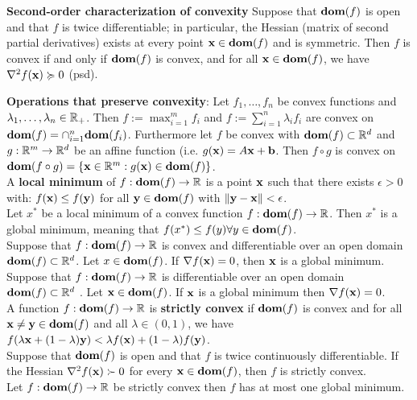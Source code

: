 \begin{framed}
    \textbf{Second-order characterization of convexity} Suppose that $\textbf{dom}(f)$ is open and that $f$ is twice differentiable; in particular, the Hessian (matrix of second partial derivatives) exists at every point $\mathbf{x} \in \textbf{dom}(f)$ and is symmetric. Then $f$ is convex if and only if $\textbf{dom}(f)$ is convex, and for all $\mathbf{x} \in \textbf{dom}(f)$, we have $\nabla^2 f(\mathbf{x}) \succcurlyeq 0$ (psd).
\end{framed}
\textbf{Operations that preserve convexity}: Let $f_1, \dots, f_n$ be convex functions and $\lambda_1, \dots, \lambda_n \in \mathbb{R}_{+}$. Then $f := \max_{i=1}^m{f_i}$ and $f := \sum_{i=1}^n{\lambda_i f_i}$ are convex on $\textbf{dom}(f) = \cap_{i=1}^n{\textbf{dom}(f_i)}$. Furthermore let $f$ be convex with $\textbf{dom}(f) \subset \mathbb{R}^d$ and $g : \mathbb{R}^m \rightarrow \mathbb{R}^d$ be an affine function (i.e. $g(\mathbf{x}) = A \mathbf{x} + \mathbf{b}$. Then $f \circ g$ is convex on $\textbf{dom}(f \circ g) = \{ \mathbf{x} \in \mathbb{R}^m : g(\mathbf{x}) \in  \textbf{dom}(f)\}$.\\
A \textbf{local minimum} of $f: \textbf{dom}(f) \rightarrow \mathbb{R}$ is a point $\mathbf{x}$ such that there exists $\epsilon > 0$ with: $f(\mathbf{x}) \leq f(\mathbf{y})$ for all $\mathbf{y} \in \textbf{dom}(f)$ with $\norm{\mathbf{y} - \mathbf{x}} < \epsilon$. \\
Let $x^*$ be a local minimum of a convex function $f : \textbf{dom}(f) \rightarrow \mathbb{R}$. Then $x^*$ is a global minimum, meaning that $f (x^*) \leq f(y) \forall y \in \textbf{dom}(f)$. \\
Suppose that $f : \textbf{dom}(f) \rightarrow \mathbb{R}$ is convex and differentiable over an open domain $\textbf{dom}(f) \subset \mathbb{R}^d$. Let $x \in \textbf{dom}(f)$. If $\nabla f(\mathbf{x}) = 0$, then $\mathbf{x}$ is a global minimum. \\
Suppose that $f : \textbf{dom}(f) \rightarrow \mathbb{R}$ is differentiable over an open domain $\textbf{dom}(f) \subset \mathbb{R}^d$ . Let $\mathbf{x} \in \textbf{dom}(f)$. If $\mathbf{x}$ is a global minimum then $\nabla f(\mathbf{x}) = 0$. \\
A function $f : \textbf{dom}(f) \rightarrow \mathbb{R}$ is \textbf{strictly convex} if $\textbf{dom}(f)$ is convex and for all $\mathbf{x} \neq \mathbf{y} \in \textbf{dom}(f)$ and all $\lambda \in (0, 1)$, we have $f(\lambda \mathbf{x} + (1 - \lambda)\mathbf{y}) < \lambda f(\mathbf{x}) + (1 - \lambda) f(\mathbf{y})$. \\
Suppose that $\textbf{dom}(f)$ is open and that $f$ is twice continuously differentiable. If the Hessian $\nabla^2 f(\mathbf{x}) \succ 0$ for every $\mathbf{x} \in \textbf{dom}(f)$, then $f$ is strictly convex. \\
Let $f : \textbf{dom}(f) \rightarrow \mathbb{R}$ be strictly convex then $f$ has at most one global minimum. \\
